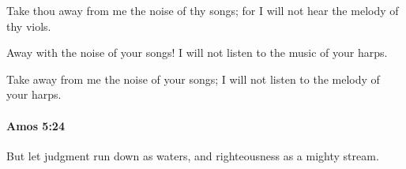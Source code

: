 			\begin{versebox}
					\item[BHS] 
					\item[LXX] 
					\item[ASV] Take thou away from me the noise of thy songs; for I will not hear the melody of thy viols.
					\item[NIV] Away with the noise of your songs! I will not listen to the music of your harps.
					\item[NRSV] Take away from me the noise of your songs; I will not listen to the melody of your harps.
			\end{versebox}

		\paragraph{Amos 5:24} %
			\label{AMOS-5-24}

			But let judgment run down as waters, and righteousness as a mighty stream.

